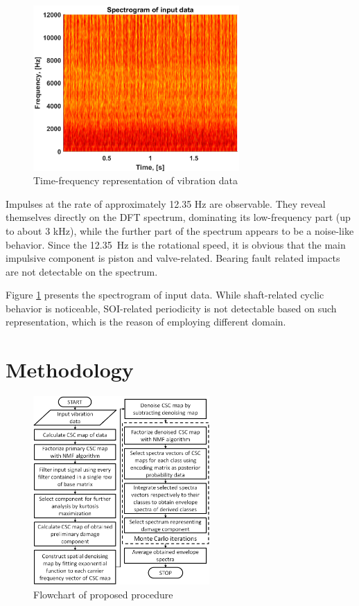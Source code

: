 \documentclass[3p, 12pt]{elsarticle} %
\begin{document}
\begin{figure}[ht!]
\centering
\includegraphics[width=0.7\textwidth]{wykresy/spec}
\caption{Time-frequency representation of vibration data}
\label{fig:spec}
\end{figure}

Impulses at the rate of approximately 12.35 Hz are observable. They reveal themselves directly on the DFT spectrum, dominating its low-frequency part (up to about 3 kHz), while the further part of the spectrum appears to be a noise-like behavior. Since the 12.35~Hz is the rotational speed, it is obvious that the main impulsive component is piston and valve-related. Bearing fault related impacts are not detectable on the spectrum.

Figure \ref{fig:spec} presents the spectrogram of input data. While shaft-related cyclic behavior is noticeable, SOI-related periodicity is not detectable based on such representation, which is the reason of employing different domain.

\section{Methodology}\label{met}

\begin{figure}[ht!]
\centering
\includegraphics[width=0.6\textwidth]{wykresy/block4}
\caption{Flowchart of proposed procedure}
\label{fig:block}
\end{figure}
\end{document}
